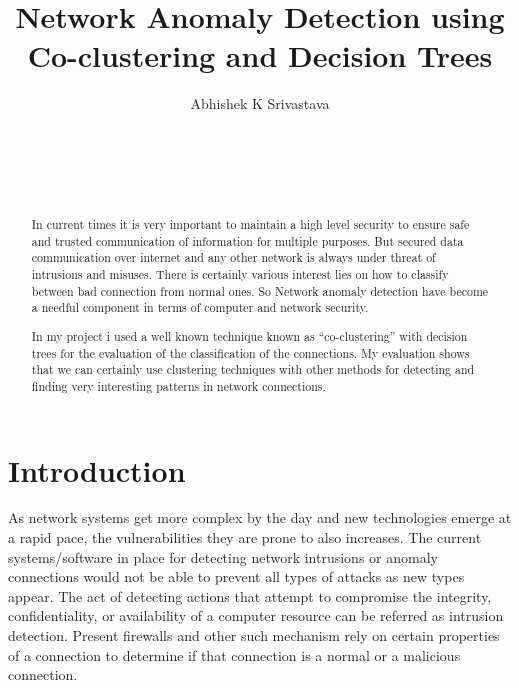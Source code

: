 \documentclass{acm_proc_article-sp}
\begin{document}
\title{Network Anomaly Detection using Co-clustering and Decision Trees}


\author{
%
%
\alignauthor
Abhishek K Srivastava \\
       \\
       \\
       \\
       \\
}
\maketitle
\begin{abstract}
In current times it is very important to maintain a high level security to ensure safe and trusted communication of information for multiple purposes. But secured data communication over internet and any other network is always under threat of intrusions and misuses. There is certainly various interest lies on how to classify between bad connection from normal ones. So Network anomaly detection have become a needful component in terms of computer and network security.

In my project i used a well known technique known as ``co-clustering'' with decision trees for the evaluation of the classification of the connections. My evaluation shows that we can certainly use clustering techniques with other methods for detecting and finding very interesting patterns in network connections.

\end{abstract}

\section{Introduction}
As network systems get more complex by the day and new technologies emerge at a rapid pace, the vulnerabilities they are prone to also increases. The current systems/software in place for detecting network intrusions or anomaly connections would not be able to prevent all types of attacks as new types appear. The act of detecting actions that attempt to compromise the integrity, confidentiality, or availability of a computer resource can be referred as intrusion detection. Present firewalls and other such mechanism rely on certain properties of a connection to determine if that connection is a normal or a malicious connection\cite{lrr}. 
\end{document}
